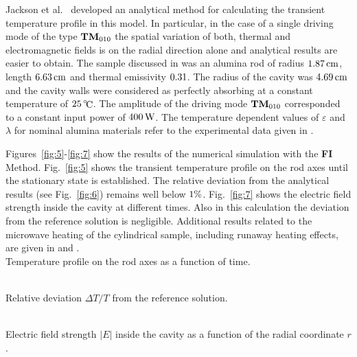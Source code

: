 \documentclass[twocolumn]{IEEEtran}
\begin{document}
Jackson et al.\ \cite{Jackson:01,Jackson:02} developed an analytical
method for calculating the transient temperature profile in this
model. In particular, in the case of a single driving mode of the type
${\bf TM}_{010}$ the spatial variation of both, thermal and electromagnetic
fields is on the radial direction alone and analytical results are
easier to obtain. The sample discussed in \cite{Jackson:01,Jackson:02}
was an alumina rod of radius $\nmbr{1.87}\cm$, length $\nmbr{6.63}\cm$
and thermal emissivity $\nmbr{0.31}$. The radius of the cavity was
$\nmbr{4.69}\cm$ and the cavity walls were considered as perfectly
absorbing at a constant temperature of $\nmbr{25}\celcius$. The amplitude
of the driving mode ${\bf TM}_{010}$ corresponded to a constant input
power of $\nmbr{400}\watt$. The temperature dependent values of
$\varepsilon$ and $\lambda$ for nominal alumina materials refer to
the experimental data given in \cite{Fukushima}.

Figures~\ref{fig:5}-\ref{fig:7} show the results of the numerical
simulation with the {\bf FI} Method. Fig.~\ref{fig:5} shows the
transient temperature profile on the rod axes until the stationary
state is established. The relative deviation from the analytical
results (see Fig.~\ref{fig:6}) remains well below $\nmbr{1}\%$.
Fig.~\ref{fig:7} shows the electric field strength inside the cavity
at different times. Also in this calculation the deviation from the
reference solution is negligible. Additional results related to
the microwave heating of the cylindrical sample, including runaway
heating effects, are given in \cite{Jackson:01} and \cite{Pinder}.
\befig[htb]
\centering
\mbox{\epsfxsize=68mm} \\[-5pt]
\caption{Temperature profile on the rod axes as a function of time.}
\label{fig:5}
\enfig
\befig[htb]
\centering
\mbox{\epsfxsize=68mm} \\[-5pt]
\caption{Relative deviation $\Delta T/T$ from the reference solution.}
\label{fig:6}
\enfig
\befig[htb]
\centering
\mbox{\epsfxsize=68mm} \\[-5pt]
\caption{Electric field strength $|E|$ inside the cavity as a function
of the radial coordinate $r$.}
\label{fig:7}
\enfig
\end{document}
